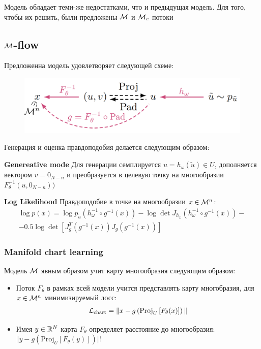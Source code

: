 Модель обладает теми-же недостатками, что и предыдущая модель. Для того, чтобы их решить, были предложены $\mathcal{M}$ и $\mathcal{M}_e$ потоки

\subsection{$\mathcal{M}$-flow}

Предложенна модель удовлетворяет следующей схеме:

\begin{figure}[h]
    \centering
    \includegraphics[width=0.6\linewidth]{chapters/petr_mokrov_s1/figs/mflow_final.png}
\end{figure}

Генерация и оценка правдоподобия делается следующим образом:

\textbf{Genereative mode}
Для генерации семплируется $u = h_{\omega}(\tilde{u}) \in U$, дополняется вектором $v = 0_{N - n}$ и преобразуется в целевую точку на многообразии $F_{\theta}^{-1}(u, 0_{N - n}))$

\textbf{Log Likelihood}
Правдоподобие в точке на многообразии $x \in \mathcal{M}^n$:
\begin{gather*}
    \log p(x) = \log p_{\tilde{u}}(h_{\omega}^{-1}\circ g^{-1}(x)) - \log \det J_{h_{\omega}}(h_{\omega}^{-1}\circ g^{-1}(x)) - \\
    - 0.5 \log \det \left[ J_g^{T}(g^{-1}(x)) J_g(g^{-1}(x))\right]
\end{gather*}

\subsubsection{Manifold chart learning}

Модель $\mathcal{M}$ явным образом учит карту многообразия следующим образом: 
\begin{itemize}
    \item Поток $F_{\theta}$ в рамках всей модели учится представлять карту многобразия, для $x \in \mathcal{M}^n$ минимизируемый лосс: 
    \vspace{-2mm}
    \begin{gather*}
        \mathcal{L}_{\text{chart}} = \Vert x - g\left(\text{Proj}_{U}\left[F_{\theta}(x)\right]\right)\Vert
    \end{gather*}
    \item Имея $y \in \mathbb{R}^N$ карта $F_{\theta}$ определяет расстояние до многообразия: $\Vert y - g\left(\text{Proj}_{U}\left[F_{\theta}(y)\right]\right)\Vert$!
\end{itemize}

